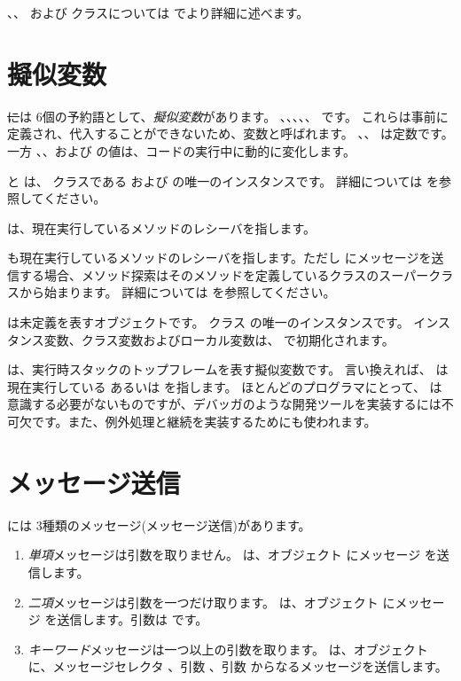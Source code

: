 \documentclass[a4paper,10pt,twoside]{book}
\begin{document}
、、 および  クラスについては  でより詳細に述べます。


\section{擬似変数}

\st には 6個の予約語として、\emph{擬似変数}があります。
、、、、、 です。
これらは事前に定義され、代入することができないため、変数と呼ばれます。
、、 は定数です。一方 、、および  の値は、コードの実行中に動的に変化します。

 と  は、 クラスである  および  の唯一のインスタンスです。
詳細については  を参照してください。

 は、現在実行しているメソッドのレシーバを指します。

 も現在実行しているメソッドのレシーバを指します。ただし \super にメッセージを送信する場合、メソッド探索はそのメソッドを定義しているクラスのスーパークラスから始まります。
詳細については  を参照してください。

 は未定義を表すオブジェクトです。
クラス  の唯一のインスタンスです。
インスタンス変数、クラス変数およびローカル変数は、 で初期化されます。

 は、実行時スタックのトップフレームを表す擬似変数です。
言い換えれば、  は現在実行している  あるいは  を指します。
ほとんどのプログラマにとって、 は意識する必要がないものですが、デバッガのような開発ツールを実装するには不可欠です。また、例外処理と継続を実装するためにも使われます。

\section{メッセージ送信}

\pharo には 3種類のメッセージ(メッセージ送信)があります。
\begin{enumerate}
  \item \emph{単項}メッセージは引数を取りません。
  は、オブジェクト  にメッセージ  を送信します。
  \item \emph{二項}メッセージは引数を一つだけ取ります。
  	 は、オブジェクト  にメッセージ \ct{+} を送信します。引数は  です。
  \item \emph{キーワード}メッセージは一つ以上の引数を取ります。
  	 は、オブジェクト  に、メッセージセレクタ
	、引数 、引数  からなるメッセージを送信します。
\end{enumerate}
\end{document}
